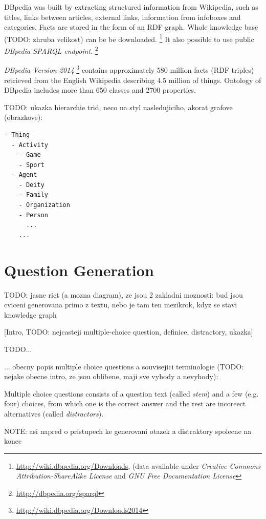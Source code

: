 \documentclass[a4paper, 12pt, twoside]{fithesis2}		%
\renewcommand{\_}{\leavevmode \kern0.0em\vbox{\hrule width0.4em}}
\newcounter{choice}
\begin{document}
DBpedia was built by extracting structured information from Wikipedia,
such as titles, links between articles, external links, information from infoboxes and categories.
Facts are stored in the form of an RDF graph.
Whole knowledge base (TODO: zhruba velikost) can be be downloaded.%
\footnote{\url{http://wiki.dbpedia.org/Downloads}, %
(data available under \emph{Creative Commons Attribution-ShareAlike License}
and \emph{GNU Free Documentation License}}
It also possible to use public \textit{DBpedia SPARQL endpoint}.%
\footnote{\url{http://dbpedia.org/sparql}}

\emph{DBpedia Version 2014}%
\footnote{\url{http://wiki.dbpedia.org/Downloads2014}}
contains approximately 580 million facts (RDF triples) retrieved from the English Wikipedia
\parencite{dbpedia} describing 4.5 million of things.
Ontology of DBpedia includes more than 650 classes and 2700 properties.

TODO: ukazka hierarchie trid, neco na styl nasledujiciho, akorat grafove (obrazkove):

\begin{verbatim}
- Thing
  - Activity
    - Game
    - Sport
  - Agent
    - Deity
    - Family
    - Organization
    - Person
      ...
    ...
\end{verbatim}

\chapter{Question Generation}
\label{chap:exercises}

TODO: jasne rict (a mozna diagram), ze jsou 2 zakladni moznosti: bud jsou cviceni generovana primo z textu, nebo je tam ten mezikrok, kdyz se stavi knowledge graph

[Intro, TODO: nejcasteji multiple-choice question, definice, distractory, ukazka]

TODO...

... obecny popis multiple choice questions a souvisejici terminologie (TODO: nejake obecne intro, ze jsou oblibene, maji sve vyhody a nevyhody):

Multiple choice questions consists of a question text (called \textit{stem})
and a few (e.g. four) choices, from which one is the correct answer
and the rest are incoreect alternatives (called \textit{distractors}).

NOTE: asi napred o pristupech ke generovani otazek a distraktory spolecne na konec
\end{document}
